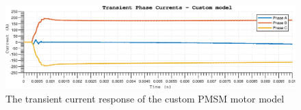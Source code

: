 \begin{figure}[htb]
\begingroup
\tikzset{}
 \centerline{\includegraphics[width=1\columnwidth]{.//Figure/EPS/custom_phase_currents.eps}}
 \endgroup
 \caption{The transient current response of the custom PMSM motor model}
 \label{fig:cutom_current_trans}
\end{figure}